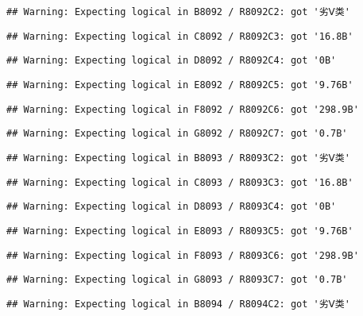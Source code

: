 \documentclass[
]{article}
\begin{document}
\begin{verbatim}
## Warning: Expecting logical in B8092 / R8092C2: got '劣Ⅴ类'
\end{verbatim}

\begin{verbatim}
## Warning: Expecting logical in C8092 / R8092C3: got '16.8B'
\end{verbatim}

\begin{verbatim}
## Warning: Expecting logical in D8092 / R8092C4: got '0B'
\end{verbatim}

\begin{verbatim}
## Warning: Expecting logical in E8092 / R8092C5: got '9.76B'
\end{verbatim}

\begin{verbatim}
## Warning: Expecting logical in F8092 / R8092C6: got '298.9B'
\end{verbatim}

\begin{verbatim}
## Warning: Expecting logical in G8092 / R8092C7: got '0.7B'
\end{verbatim}

\begin{verbatim}
## Warning: Expecting logical in B8093 / R8093C2: got '劣Ⅴ类'
\end{verbatim}

\begin{verbatim}
## Warning: Expecting logical in C8093 / R8093C3: got '16.8B'
\end{verbatim}

\begin{verbatim}
## Warning: Expecting logical in D8093 / R8093C4: got '0B'
\end{verbatim}

\begin{verbatim}
## Warning: Expecting logical in E8093 / R8093C5: got '9.76B'
\end{verbatim}

\begin{verbatim}
## Warning: Expecting logical in F8093 / R8093C6: got '298.9B'
\end{verbatim}

\begin{verbatim}
## Warning: Expecting logical in G8093 / R8093C7: got '0.7B'
\end{verbatim}

\begin{verbatim}
## Warning: Expecting logical in B8094 / R8094C2: got '劣Ⅴ类'
\end{verbatim}
\end{document}

